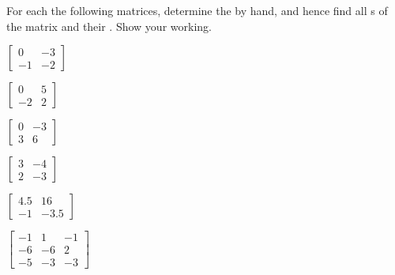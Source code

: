 \begin{exercise}  
For each the following matrices, determine the  by hand, and hence find all s of the matrix and their .
Show your working.

\begin{Parts}
\item \(\begin{bmatrix} 0 & -3
\\-1 & -2 \end{bmatrix}\)

\item \(\begin{bmatrix} 0 & 5
\\-2 & 2 \end{bmatrix}\)

\begin{reduce}
\item \(\begin{bmatrix} 0 & -3
\\3 & 6 \end{bmatrix}\)

\item \(\begin{bmatrix} 3 & -4
\\2 & -3 \end{bmatrix}\)
\end{reduce}

\item \(\begin{bmatrix} 4.5 & 16
\\-1 & -3.5 \end{bmatrix}\)

\item \(\begin{bmatrix} -1 & 1 & -1
\\-6 & -6 & 2
\\-5 & -3 & -3 \end{bmatrix}\)


\end{Parts}
\end{exercise}
